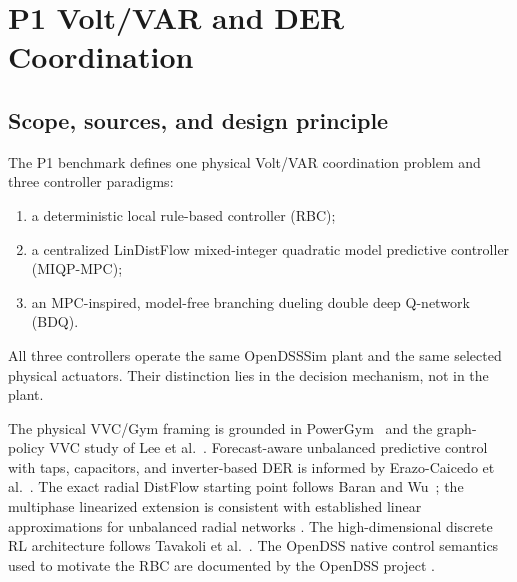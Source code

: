 %
%

\section{P1 Volt/VAR and DER Coordination}
\label{sec:p1_control_science}

\subsection{Scope, sources, and design principle}
\label{subsec:p1_scope}

The P1 benchmark defines one physical Volt/VAR coordination problem and three
controller paradigms:
\begin{enumerate}
    \item a deterministic local rule-based controller (RBC);
    \item a centralized LinDistFlow mixed-integer quadratic model predictive controller
          (MIQP-MPC);
    \item an MPC-inspired, model-free branching dueling double deep Q-network (BDQ).
\end{enumerate}
All three controllers operate the same OpenDSSSim plant and the same selected physical
actuators.  Their distinction lies in the decision mechanism, not in the plant.

The physical VVC/Gym framing is grounded in PowerGym~\cite{fan2022powergym} and the
graph-policy VVC study of Lee et al.~\cite{lee2022graph}.  Forecast-aware unbalanced
predictive control with taps, capacitors, and inverter-based DER is informed by
Erazo-Caicedo et al.~\cite{erazo2022model}.  The exact radial DistFlow starting point
follows Baran and Wu~\cite{baran1989sizing}; the multiphase linearized extension is
consistent with established linear approximations for unbalanced radial networks
\cite{gan2014multiphase}.  The high-dimensional discrete RL architecture follows
Tavakoli et al.~\cite{tavakoli2018branching}.  The OpenDSS native control semantics used
to motivate the RBC are documented by the OpenDSS project
\cite{opendss_invcontrol,opendss_capcontrol,opendss_regcontrol}.

